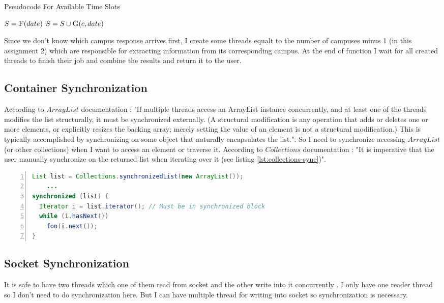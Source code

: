 \documentclass[12pt]{article}
\begin{document}
\begin{algorithm}
\caption{Pseudocode For Available Time Slots}
\label{algorithm:available-time-slots}
\begin{algorithmic}[1]
\State $S = \Call{F}{date}$
\State $S = S \cup \Call{G}{c, date}$
\EndFor
\EndFunction
\end{algorithmic}
\end{algorithm}

\par Since we don't know which campus response arrives first, I create some threads equalt to the number of campuses minus 1 (in this assignment 2) which are responsible for extracting information from its corresponding campus. At the end of function I wait for all created threads to finish their job and combine the results and return it to the user.

\subsection{Container Synchronization}
According to $ArrayList$ documentation \cite{ArrayList}: "If multiple threads access an ArrayList instance concurrently, and at least one of the threads modifies the list structurally, it must be synchronized externally. (A structural modification is any operation that adds or deletes one or more elements, or explicitly resizes the backing array; merely setting the value of an element is not a structural modification.) This is typically accomplished by synchronizing on some object that naturally encapsulates the list.". So I need to synchronize accessing $ArrayList$ (or other collections) when I want to access an element or traverse it. According to $Collections$ documentation \cite{Collections}: "It is imperative that the user manually synchronize on the returned list when iterating over it (see listing \ref{lst:collections-sync})".

\begin{lstlisting}[language=java,label={lst:collections-sync},caption={Collections Synchronization},numbers=left]
List list = Collections.synchronizedList(new ArrayList());
    ...
synchronized (list) {
  Iterator i = list.iterator(); // Must be in synchronized block
  while (i.hasNext())
    foo(i.next());
}
\end{lstlisting}

\subsection{Socket Synchronization}
It is safe to have two threads which one of them read from socket and the other write into it concurrently \cite{socket-full-duplex}. I only have one reader thread so I don't need to do synchronization here. But I can have multiple thread for writing into socket so synchronization is necessary.
\end{document}
